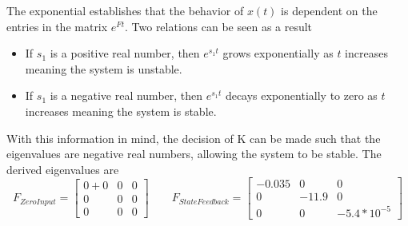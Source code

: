 \documentclass[12pt]{article}
\begin{document}
The exponential establishes that the behavior of $x(t)$ is dependent on the entries in the matrix $e^{Ft}$. Two relations can be seen as a result
\begin{itemize}
  \item If $s_1$ is a positive real number, then $e^{s_1 t}$ grows exponentially as $t$ increases meaning the system is unstable.
  \item If $s_1$ is a negative real number, then $e^{s_1 t}$ decays exponentially to zero as $t$ increases meaning the system is stable.
\end{itemize}
With this information in mind, the decision of K can be made such that the eigenvalues are negative real numbers, allowing the system to be stable. The derived eigenvalues are
\begin{equation*}
F_{ZeroInput}= 
\begin{bmatrix} 
0+0 & 0 & 0
\\
0 & 0 & 0
\\
0 & 0 & 0
\end{bmatrix}
\qquad
F_{StateFeedback}= 
\begin{bmatrix} 
-0.035 & 0 & 0
\\
0 & -11.9 & 0
\\
0 & 0 & -5.4*10^{-5}
\end{bmatrix}
\end{equation*}
\end{document}
